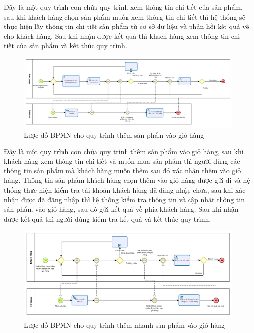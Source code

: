 Đây là một quy trình con chứa quy trình xem thông tin chi tiết của sản phẩm, sau khi khách hàng chọn sản phẩm muốn xem thông tin chi tiết thì hệ thống sẽ thực hiện lấy thông tin chi tiết sản phẩm từ cơ sở dữ liệu và phản hồi kết quả về cho khách hàng. Sau khi nhận được kết quả thì khách hàng xem thông tin chi tiết của sản phẩm và kết thúc quy trình.
 
 
 
\begin{figure}[!htp]
    \centering
    \includegraphics[width=17cm]{img/BPMN/customer_buy/customer_add_to_card.png}
    \newline
    \caption{Lược đồ BPMN cho quy trình thêm sản phẩm vào giỏ hàng}
\end{figure}
 
Đây là một quy trình con chứa quy trình thêm sản phẩm vào giỏ hàng, sau khi khách hàng xem thông tin chi tiết và muốn mua sản phẩm thì người dùng các thông tin sản phẩm mà khách hàng muốn thêm sau đó xác nhận thêm vào giỏ hàng. Thông tin sản phẩm khách hàng chọn thêm vào giỏ hàng được gửi đi và hệ thống thực hiện kiểm tra tài khoản khách hàng đã đăng nhập chưa, sau khi xác nhận được đã đăng nhập thì hệ thống kiểm tra thông tin và cập nhật thông tin sản phẩm vào giỏ hàng, sau đó gửi kết quả về phía khách hàng. Sau khi nhận được kết quả thì người dùng kiểm tra kết quả và kết thúc quy trình.
 
 
\begin{figure}[!htp]
    \centering
    \includegraphics[width=16cm]{img/BPMN/customer_buy/customer_add_fast.png}
    \newline
    \caption{Lược đồ BPMN cho quy trình thêm nhanh sản phẩm vào giỏ hàng}
\end{figure}
 
